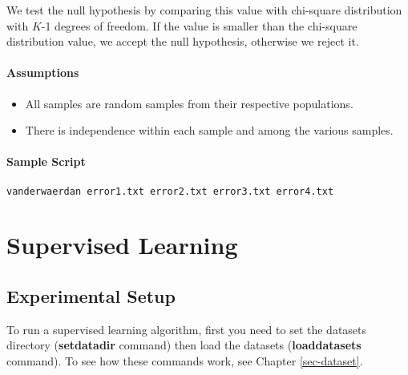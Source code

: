 \documentclass[a4paper,12pt]{book}
\begin{document}
We test the null hypothesis by comparing this value with chi-square distribution with $K$-1 degrees of freedom.
If the value is smaller than the chi-square distribution value, we accept the null hypothesis, otherwise we reject it.

\subsubsection{Assumptions}
\begin{itemize}
\item All samples are random samples from their respective populations.
\item There is independence within each sample and among the various samples.
\end{itemize}

\subsubsection{Sample Script}
\begin{verbatim}
vanderwaerdan error1.txt error2.txt error3.txt error4.txt
\end{verbatim}

\chapter{Supervised Learning}

\section{Experimental Setup}
To run a supervised learning algorithm, first you need to set the datasets directory ({\bf setdatadir} command) then load the datasets ({\bf loaddatasets} command). To see how these commands work, see Chapter \ref{sec-dataset}.
\end{document}
